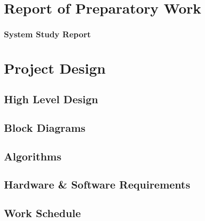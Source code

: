 \documentclass[11pt]{report}
\begin{document}
\chapter{\label{work}Report of Preparatory Work }
\subsection{System Study Report}



\chapter{Project Design}
 \label{xx}

\section{High Level Design}
\section{Block Diagrams}


\section{Algorithms}

\section{Hardware \& Software Requirements}
\section{Work Schedule}
\end{document}
